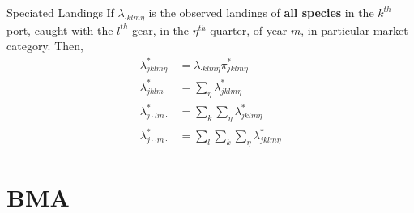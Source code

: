 \documentclass[ xcolor = pdftex, dvipsnames, table ]{beamer}
\begin{document}
\begin{frame}{Speciated Landings}
If $\lambda_{\cdot klm\eta}$ is the observed landings of \textbf{all species} in the $k^{th}$ port, caught with the $l^{th}$ gear, in the $\eta^{th}$ quarter, of year $m$, in particular market category. Then,
\begin{align*}
	\lambda^*_{jklm\eta} &=\lambda_{\cdot k l m \eta}\pi^*_{jklm\eta}\\%
	\lambda^*_{jklm\cdot} &=\sum_{\eta}\lambda^*_{jklm\eta}\\
	\lambda^*_{j\cdot lm\cdot} &=\sum_{k}\sum_{\eta}\lambda^*_{jklm\eta}\\
	\lambda^*_{j\cdot \cdot m\cdot} &=\sum_{l}\sum_{k}\sum_{\eta}\lambda^*_{jklm\eta}
\end{align*}
\end{frame}

%
%

\section{BMA}
\end{document}
